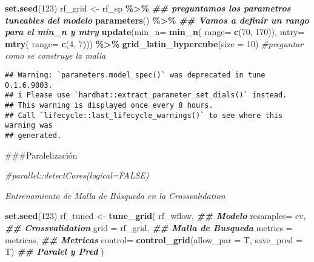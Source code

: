 \documentclass[
]{article}
\newenvironment{Shaded}{\begin{snugshade}}{\end{snugshade}}
\newcommand{\AttributeTok}[1]{\textcolor[rgb]{0.13,0.29,0.53}{#1}}
\newcommand{\CommentTok}[1]{\textcolor[rgb]{0.56,0.35,0.01}{\textit{#1}}}
\newcommand{\DecValTok}[1]{\textcolor[rgb]{0.00,0.00,0.81}{#1}}
\newcommand{\DocumentationTok}[1]{\textcolor[rgb]{0.56,0.35,0.01}{\textbf{\textit{#1}}}}
\newcommand{\FunctionTok}[1]{\textcolor[rgb]{0.13,0.29,0.53}{\textbf{#1}}}
\newcommand{\NormalTok}[1]{#1}
\newcommand{\OtherTok}[1]{\textcolor[rgb]{0.56,0.35,0.01}{#1}}
\newcommand{\SpecialCharTok}[1]{\textcolor[rgb]{0.81,0.36,0.00}{\textbf{#1}}}
\begin{document}
\begin{Shaded}
\begin{Highlighting}[]
\FunctionTok{set.seed}\NormalTok{(}\DecValTok{123}\NormalTok{)}
\NormalTok{rf\_grid }\OtherTok{\textless{}{-}}\NormalTok{ rf\_sp }\SpecialCharTok{\%\textgreater{}\%}
\DocumentationTok{\#\# preguntamos los parametros tuneables del modelo}
\FunctionTok{parameters}\NormalTok{() }\SpecialCharTok{\%\textgreater{}\%}
\DocumentationTok{\#\# Vamos a definir un rango para el min\_n y mtry}
\FunctionTok{update}\NormalTok{(}\AttributeTok{min\_n=} \FunctionTok{min\_n}\NormalTok{( }\AttributeTok{range=} \FunctionTok{c}\NormalTok{(}\DecValTok{70}\NormalTok{, }\DecValTok{170}\NormalTok{)),}
\AttributeTok{mtry=} \FunctionTok{mtry}\NormalTok{( }\AttributeTok{range=} \FunctionTok{c}\NormalTok{(}\DecValTok{4}\NormalTok{, }\DecValTok{7}\NormalTok{))) }\SpecialCharTok{\%\textgreater{}\%}
\FunctionTok{grid\_latin\_hypercube}\NormalTok{(}\AttributeTok{size =} \DecValTok{10}\NormalTok{) }\CommentTok{\#preguntar como se construye la malla}
\end{Highlighting}
\end{Shaded}

\begin{verbatim}
## Warning: `parameters.model_spec()` was deprecated in tune 0.1.6.9003.
## i Please use `hardhat::extract_parameter_set_dials()` instead.
## This warning is displayed once every 8 hours.
## Call `lifecycle::last_lifecycle_warnings()` to see where this warning was
## generated.
\end{verbatim}

\#\#\#Paralelización

\begin{Shaded}
\begin{Highlighting}[]
\CommentTok{\#parallel::detectCores(logical=FALSE)}
\end{Highlighting}
\end{Shaded}

\emph{Entrenamiento de Malla de Búsqueda en la Crossvalidation}

\begin{Shaded}
\begin{Highlighting}[]
\FunctionTok{set.seed}\NormalTok{(}\DecValTok{123}\NormalTok{)}
\NormalTok{rf\_tuned }\OtherTok{\textless{}{-}} \FunctionTok{tune\_grid}\NormalTok{(}
\NormalTok{        rf\_wflow, }\DocumentationTok{\#\# Modelo}
        \AttributeTok{resamples=}\NormalTok{ cv, }\DocumentationTok{\#\# Crossvalidation}
        \AttributeTok{grid =}\NormalTok{ rf\_grid, }\DocumentationTok{\#\# Malla de Busqueda}
        \AttributeTok{metrics =}\NormalTok{ metricas, }\DocumentationTok{\#\# Metricas}
        \AttributeTok{control=} \FunctionTok{control\_grid}\NormalTok{(}\AttributeTok{allow\_par =}\NormalTok{ T, }\AttributeTok{save\_pred =}\NormalTok{ T) }\DocumentationTok{\#\# Paralel y Pred}
\NormalTok{)}
\end{Highlighting}
\end{Shaded}
\end{document}
